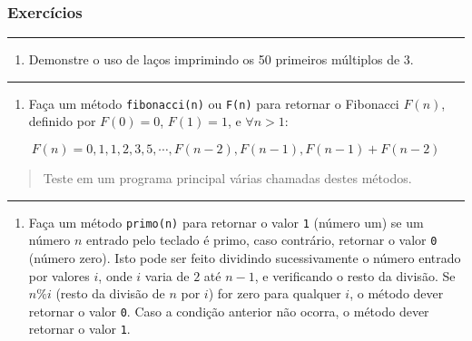 \documentclass[12pt,a4paper]{article}
\providecommand{\tightlist}{%
      \setlength{\itemsep}{0pt}\setlength{\parskip}{0pt}}
\begin{document}
    \hypertarget{exercuxedcios}{%
\subsubsection{Exercícios}\label{exercuxedcios}}

    \begin{center}\rule{0.5\linewidth}{0.5pt}\end{center}

\begin{enumerate}
\def\labelenumi{\arabic{enumi}.}
\tightlist
\item
  Demonstre o uso de laços imprimindo os 50 primeiros múltiplos de 3.
\end{enumerate}

    \begin{center}\rule{0.5\linewidth}{0.5pt}\end{center}

\begin{enumerate}
\def\labelenumi{\arabic{enumi}.}
\setcounter{enumi}{1}
\tightlist
\item
  Faça um método \texttt{fibonacci(n)} ou \texttt{F(n)} para retornar o
  Fibonacci \(F(n)\), definido por \(F(0)=0\), \(F(1)=1\), e
  \(\forall n>1\):
\end{enumerate}

\[F(n) = 0, 1, 1, 2, 3, 5, \cdots, F(n-2), F(n-1), F(n-1) + F(n-2) \]

\begin{quote}
Teste em um programa principal várias chamadas destes métodos.
\end{quote}

    \begin{center}\rule{0.5\linewidth}{0.5pt}\end{center}

\begin{enumerate}
\def\labelenumi{\arabic{enumi}.}
\setcounter{enumi}{2}
\tightlist
\item
  Faça um método \texttt{primo(n)} para retornar o valor \texttt{1}
  (número um) se um número \(n\) entrado pelo teclado é primo, caso
  contrário, retornar o valor \texttt{0} (número zero). Isto pode ser
  feito dividindo sucessivamente o número entrado por valores \(i\),
  onde \(i\) varia de \(2\) até \(n-1\), e verificando o resto da
  divisão. Se \(n\%i\) (resto da divisão de \(n\) por \(i\)) for zero
  para qualquer \(i\), o método dever retornar o valor \texttt{0}. Caso
  a condição anterior não ocorra, o método dever retornar o valor
  \texttt{1}.
\end{enumerate}
\end{document}
